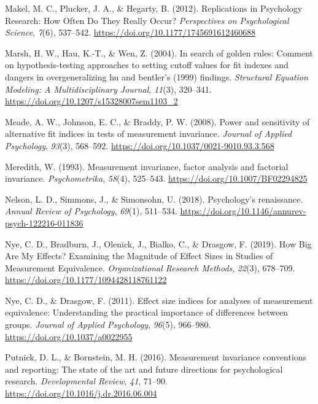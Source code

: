 \documentclass[
  man]{apa7}
\newlength{\cslhangindent}
\newlength{\cslentryspacingunit} %
\newenvironment{CSLReferences}[2] %
 {%
  \setlength{\parindent}{0pt}
  \ifodd #1
  \let\oldpar\par
  \def\par{\hangindent=\cslhangindent\oldpar}
  \fi
  \setlength{\parskip}{#2\cslentryspacingunit}
 }%
 {}
\begin{document}
\begin{CSLReferences}{1}{0}
\leavevmode{}%
Makel, M. C., Plucker, J. A., \& Hegarty, B. (2012). Replications in Psychology Research: How Often Do They Really Occur? \emph{Perspectives on Psychological Science}, \emph{7}(6), 537--542. \url{https://doi.org/10.1177/1745691612460688}

\leavevmode{}%
Marsh, H. W., Hau, K.-T., \& Wen, Z. (2004). In search of golden rules: Comment on hypothesis-testing approaches to setting cutoff values for fit indexes and dangers in overgeneralizing hu and bentler's (1999) findings. \emph{Structural Equation Modeling: A Multidisciplinary Journal}, \emph{11}(3), 320--341. \url{https://doi.org/10.1207/s15328007sem1103_2}

\leavevmode{}%
Meade, A. W., Johnson, E. C., \& Braddy, P. W. (2008). Power and sensitivity of alternative fit indices in tests of measurement invariance. \emph{Journal of Applied Psychology}, \emph{93}(3), 568--592. \url{https://doi.org/10.1037/0021-9010.93.3.568}

\leavevmode{}%
Meredith, W. (1993). Measurement invariance, factor analysis and factorial invariance. \emph{Psychometrika}, \emph{58}(4), 525--543. \url{https://doi.org/10.1007/BF02294825}

\leavevmode{}%
Nelson, L. D., Simmons, J., \& Simonsohn, U. (2018). Psychology's renaissance. \emph{Annual Review of Psychology}, \emph{69}(1), 511--534. \url{https://doi.org/10.1146/annurev-psych-122216-011836}

\leavevmode{}%
Nye, C. D., Bradburn, J., Olenick, J., Bialko, C., \& Drasgow, F. (2019). How Big Are My Effects? Examining the Magnitude of Effect Sizes in Studies of Measurement Equivalence. \emph{Organizational Research Methods}, \emph{22}(3), 678--709. \url{https://doi.org/10.1177/1094428118761122}

\leavevmode{}%
Nye, C. D., \& Drasgow, F. (2011). Effect size indices for analyses of measurement equivalence: Understanding the practical importance of differences between groups. \emph{Journal of Applied Psychology}, \emph{96}(5), 966--980. \url{https://doi.org/10.1037/a0022955}

\leavevmode{}%
Putnick, D. L., \& Bornstein, M. H. (2016). Measurement invariance conventions and reporting: The state of the art and future directions for psychological research. \emph{Developmental Review}, \emph{41}, 71--90. \url{https://doi.org/10.1016/j.dr.2016.06.004}


\end{CSLReferences}
\end{document}
